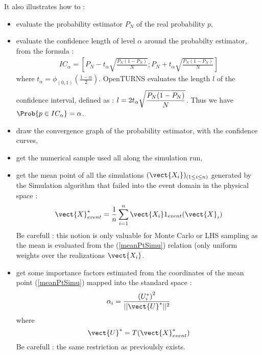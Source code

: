 It also illustrates how to  :
\begin{itemize}
\item evaluate the probability estimator $P_N$ of the real probability $p$,
\item evaluate the confidence length of level $\alpha$ around the probabilty estimator, from the formula :
  \begin{align*}
    IC_\alpha = [P_N - t_{\alpha}\sqrt{\frac{P_N(1-P_N)}{N}}; P_N + t_{\alpha}\sqrt{\frac{P_N(1-P_N)}{N}}]
  \end{align*}
  where $t_{\alpha} = \phi_{(0,1)}(\frac{1-\alpha}{2})$. OpenTURNS evaluates the length $l$ of the confidence interval, defined as : $\displaystyle l = 2t_{\alpha}\sqrt{\frac{P_N(1-P_N)}{N}}^{\strut}$. Thus we have $\Prob{p \in IC_\alpha} = \alpha$.
\item draw the convergence graph of the probability estimator, with the confidence curves,
\item get the numerical sample used all along the simulation run,
\item get the mean point  of all the simulations $ (\vect{X_i})_{(1\leq i \leq n)}$ generated by the Simulation algorithm that failed into the event domain in the physical space :
  \begin{equation}\label{meanPtSimu}
    \vect{X}^*_{event} = \displaystyle \frac{1}{n} \sum_{i=1}^{n} \vect{X_i}1_{event}(\vect{X}_i)
  \end{equation}
  Be carefull : this notion is only valuable for Monte Carlo or LHS sampling as the mean is evaluated from the (\ref{meanPtSimu}) relation (only uniform weights over the realizations $\vect{X_i}$.
\item get some importance factors estimated from the coordinates of the mean point (\ref{meanPtSimu}) mapped into the standard space :
  \begin{equation}\label{impFctSimu}
    \alpha_i = \displaystyle \frac{\left(U_{i}^*\right)^2}{||\vect{U}^*||^2}
  \end{equation}
  where
  \begin{equation}\label{meanPtSimuStdSpace}
    \vect{U}^* = T(\vect{X}^*_{event})
  \end{equation}
  Be carefull : the same restriction as previoulsly exists.
\end{itemize}




